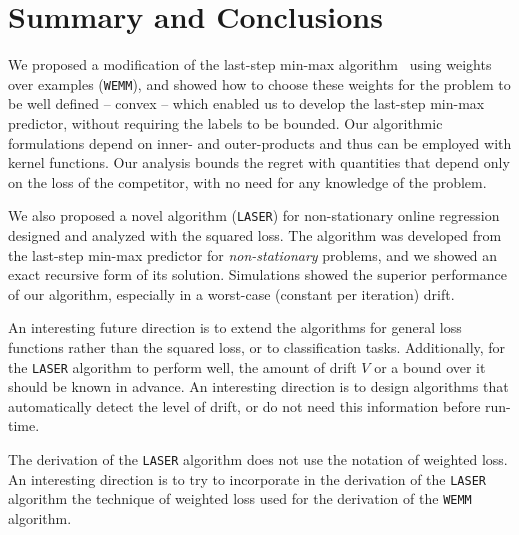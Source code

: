\chapter{Summary and Conclusions}

We proposed a modification of the last-step min-max algorithm~\citep{Forster} using weights over examples (\texttt{WEMM}), and showed how to choose these weights for the problem to be well defined -- convex -- which enabled us to develop the last-step min-max predictor, without requiring the labels to be bounded. Our algorithmic formulations depend on inner- and outer-products and thus can be employed with kernel functions. Our analysis bounds the regret with quantities that depend only on the loss of the competitor, with no need for any knowledge of the problem.

We also proposed a novel algorithm (\texttt{LASER}) for non-stationary online regression designed and
analyzed with the squared loss. The algorithm was developed from the
last-step min-max predictor for {\em non-stationary} problems, and we
showed an exact recursive form of its solution.
 Simulations showed the superior performance of our algorithm, especially in a worst-case (constant per iteration) drift.

An interesting future direction is to extend the algorithms for general loss functions rather than the squared loss, or to classification tasks. Additionally, for the \texttt{LASER}
algorithm to perform well, the amount of drift $V$ or a bound over it
should be known in advance. An interesting direction
is to design algorithms that automatically detect the
level of drift, or do not need this information before run-time.

The derivation of the \texttt{LASER} algorithm does not use the notation of weighted loss. An interesting direction
is to try to incorporate in the derivation of the \texttt{LASER} algorithm the technique of weighted loss used for the derivation of the \texttt{WEMM} algorithm.
